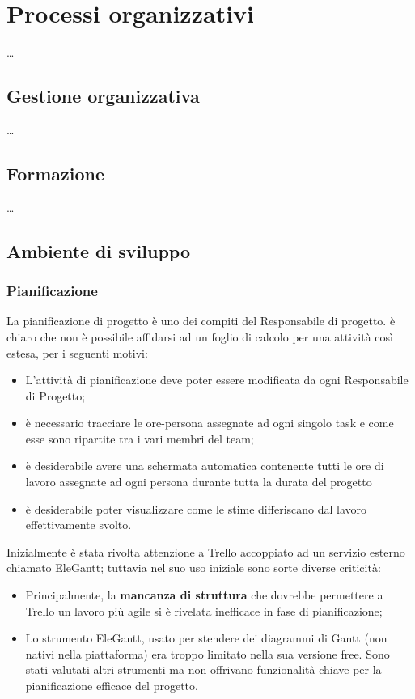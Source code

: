 
\section{Processi organizzativi} \dots

\subsection{Gestione organizzativa} \dots

\subsection{Formazione} \dots

\subsection{Ambiente di sviluppo} 

\subsubsection{Pianificazione}

La pianificazione di progetto è uno dei compiti del Responsabile di progetto. è chiaro che non è possibile affidarsi ad un foglio di calcolo per una attività così estesa, per i seguenti motivi:

\begin{itemize}
\item L'attività di pianificazione deve poter essere modificata da ogni Responsabile di Progetto;
\item è necessario tracciare le ore-persona assegnate ad ogni singolo task e come esse sono ripartite tra i vari membri del team;
\item è desiderabile avere una schermata automatica contenente tutti le ore di lavoro assegnate ad ogni persona durante tutta la durata del progetto
\item è desiderabile poter visualizzare come le stime differiscano dal lavoro effettivamente svolto.
\end{itemize}

Inizialmente è stata rivolta attenzione a Trello accoppiato ad un servizio esterno chiamato EleGantt; tuttavia nel suo uso iniziale sono sorte diverse criticità:

\begin{itemize}
\item Principalmente, la \textbf{mancanza di struttura} che dovrebbe permettere a Trello un lavoro più agile si è rivelata inefficace in fase di pianificazione;
\item Lo strumento EleGantt, usato per stendere dei diagrammi di Gantt (non nativi nella piattaforma) era troppo limitato nella sua versione free. Sono stati valutati altri strumenti ma non offrivano funzionalità chiave per la pianificazione efficace del progetto.
\end{itemize}

